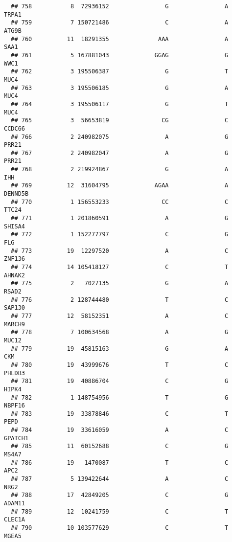 \documentclass[12pt,twoside]{reedthesis}
\theoremstyle{definition}
\theoremstyle{definition}
\theoremstyle{remark}
\begin{document}
\begin{verbatim}
  ## 758           8  72936152                G                A          TRPA1
  ## 759           7 150721486                C                A          ATG9B
  ## 760          11  18291355              AAA                A           SAA1
  ## 761           5 167881043             GGAG                G           WWC1
  ## 762           3 195506387                G                T           MUC4
  ## 763           3 195506185                G                A           MUC4
  ## 764           3 195506117                G                T           MUC4
  ## 765           3  56653819               CG                C         CCDC66
  ## 766           2 240982075                A                G          PRR21
  ## 767           2 240982047                A                G          PRR21
  ## 768           2 219924867                G                A            IHH
  ## 769          12  31604795             AGAA                A        DENND5B
  ## 770           1 156553233               CC                C          TTC24
  ## 771           1 201860591                A                G         SHISA4
  ## 772           1 152277797                C                G            FLG
  ## 773          19  12297520                A                C         ZNF136
  ## 774          14 105418127                C                T         AHNAK2
  ## 775           2   7027135                G                A          RSAD2
  ## 776           2 128744480                T                C         SAP130
  ## 777          12  58152351                A                C         MARCH9
  ## 778           7 100634568                A                G          MUC12
  ## 779          19  45815163                G                A            CKM
  ## 780          19  43999676                T                C         PHLDB3
  ## 781          19  40886704                C                G          HIPK4
  ## 782           1 148754956                T                G         NBPF16
  ## 783          19  33878846                C                T           PEPD
  ## 784          19  33616059                A                C        GPATCH1
  ## 785          11  60152688                C                G          MS4A7
  ## 786          19   1470087                T                C           APC2
  ## 787           5 139422644                A                C           NRG2
  ## 788          17  42849205                C                G         ADAM11
  ## 789          12  10241759                C                T         CLEC1A
  ## 790          10 103577629                C                T          MGEA5

\end{verbatim}
\end{document}
